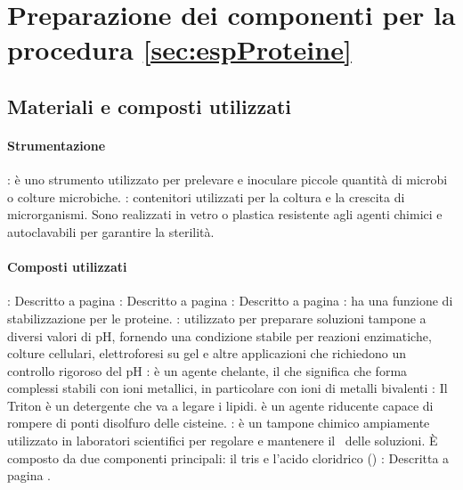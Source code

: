 \section{Preparazione dei componenti per la procedura \ref*{sec:espProteine}}

\subsection{Materiali e composti utilizzati}
\begingroup
{}
\paragraph{Strumentazione}
\begin{itemize}
	\itemb[Ansa]: è uno strumento utilizzato per prelevare e inoculare piccole quantità di microbi o colture microbiche.
	: contenitori utilizzati per la coltura e la crescita di microrganismi. Sono realizzati in vetro o plastica resistente agli agenti chimici e autoclavabili per garantire la sterilità. 
\end{itemize}

\paragraph{Composti utilizzati}
\begin{itemize}
	: Descritto a pagina \pageref{it:prepLBsolido-CompostiUtilizzati}
	: Descritto a pagina \pageref{it:prepLBsolido-CompostiUtilizzati}
	: Descritto a pagina \pageref{it:prepLBsolido-CompostiUtilizzati}
	\itemb[Saccarosio]: ha una funzione di stabilizzazione per le proteine.
	: utilizzato per preparare soluzioni tampone a diversi valori di pH, fornendo una condizione stabile per reazioni enzimatiche, colture cellulari, elettroforesi su gel e altre applicazioni che richiedono un controllo rigoroso del pH
	: è un agente chelante, il che significa che forma complessi stabili con ioni metallici, in particolare con ioni di metalli bivalenti 
	\itemb[Triton X-100]: Il Triton è un detergente che va a legare i lipidi.
	 è un agente riducente capace di rompere di ponti disolfuro delle cisteine.
	: è un tampone chimico ampiamente utilizzato in laboratori scientifici per regolare e mantenere il \pH\ delle soluzioni. È composto da due componenti principali: il \gls{tris} e l'acido cloridrico ()
	\itemb[Ampicillina]: Descritta a pagina \pageref{it:prepLBsolido-CompostiUtilizzati}.
\end{itemize}

